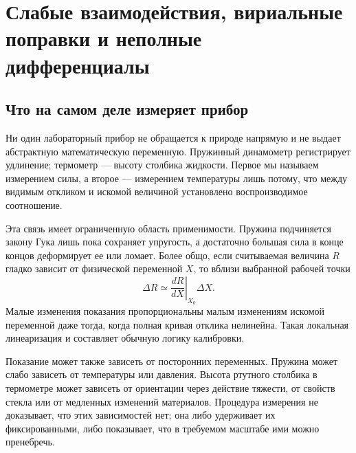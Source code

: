 \chapter{Слабые взаимодействия, вириальные поправки и неполные дифференциалы}


\section{Что на самом деле измеряет прибор}

Ни один лабораторный прибор не обращается к природе напрямую и не выдает абстрактную математическую переменную. Пружинный динамометр регистрирует удлинение; термометр — высоту столбика жидкости. Первое мы называем измерением силы, а второе — измерением температуры лишь потому, что между видимым откликом и искомой величиной установлено воспроизводимое соотношение.

Эта связь имеет ограниченную область применимости. Пружина подчиняется закону Гука лишь пока сохраняет упругость, а достаточно большая сила в конце концов деформирует ее или ломает. Более общо, если считываемая величина \(R\) гладко зависит от физической переменной \(X\), то вблизи выбранной рабочей точки \begin{equation}
 \Delta R \simeq
 \left.\frac{dR}{dX}\right|_{X_0}\Delta X.
 \label{eq:sm6-local-linear-response}
\end{equation} Малые изменения показания пропорциональны малым изменениям искомой переменной даже тогда, когда полная кривая отклика нелинейна. Такая локальная линеаризация и составляет обычную логику калибровки.

Показание может также зависеть от посторонних переменных. Пружина может слабо зависеть от температуры или давления. Высота ртутного столбика в термометре может зависеть от ориентации через действие тяжести, от свойств стекла или от медленных изменений материалов. Процедура измерения не доказывает, что этих зависимостей нет; она либо удерживает их фиксированными, либо показывает, что в требуемом масштабе ими можно пренебречь.

